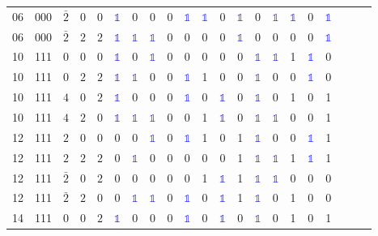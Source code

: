 \begin{longtable*}{c| cccccccccccccccccccc }
06& 000& $\bar{2}$& $0$& $0$& \textcolor{blue}{$\mathds{1}$}& 0& 0& 0& \textcolor{blue}{$\mathds{1}$}& \textcolor{blue}{$\mathds{1}$}& 0& \textcolor{blue}{$\mathds{1}$}& 0& \textcolor{blue}{$\mathds{1}$}& \textcolor{blue}{$\mathds{1}$}& 0& \textcolor{blue}{$\mathds{1}$}\\
06& 000& $\bar{2}$& $2$& $2$& \textcolor{blue}{$\mathds{1}$}& \textcolor{blue}{$\mathds{1}$}& \textcolor{blue}{$\mathds{1}$}& 0& 0& 0& 0& \textcolor{blue}{$\mathds{1}$}& 0& 0& 0& 0& \textcolor{blue}{$\mathds{1}$}\\
10& 111& $0$& $0$& $0$& \textcolor{blue}{$\mathds{1}$}& 0& \textcolor{blue}{$\mathds{1}$}& 0& 0& 0& 0& 0& \textcolor{blue}{$\mathds{1}$}& \textcolor{blue}{$\mathds{1}$}& 1& \textcolor{blue}{$\mathds{1}$}& 0\\
10& 111& $0$& $2$& $2$& \textcolor{blue}{$\mathds{1}$}& \textcolor{blue}{$\mathds{1}$}& 0& 0& \textcolor{blue}{$\mathds{1}$}& 1& 0& 0& \textcolor{blue}{$\mathds{1}$}& 0& 0& \textcolor{blue}{$\mathds{1}$}& 0\\
10& 111& $4$& $0$& $2$& \textcolor{blue}{$\mathds{1}$}& 0& 0& 0& \textcolor{blue}{$\mathds{1}$}& 0& \textcolor{blue}{$\mathds{1}$}& 0& \textcolor{blue}{$\mathds{1}$}& 0& 1& 0& 1\\
10& 111& $4$& $2$& $0$& \textcolor{blue}{$\mathds{1}$}& \textcolor{blue}{$\mathds{1}$}& \textcolor{blue}{$\mathds{1}$}& 0& 0& 1& \textcolor{blue}{$\mathds{1}$}& 0& \textcolor{blue}{$\mathds{1}$}& \textcolor{blue}{$\mathds{1}$}& 0& 0& 1\\
12& 111& $2$& $0$& $0$& 0& 0& \textcolor{blue}{$\mathds{1}$}& 0& \textcolor{blue}{$\mathds{1}$}& 1& 0& 1& \textcolor{blue}{$\mathds{1}$}& 0& 0& \textcolor{blue}{$\mathds{1}$}& 1\\
12& 111& $2$& $2$& $2$& 0& \textcolor{blue}{$\mathds{1}$}& 0& 0& 0& 0& 0& 1& \textcolor{blue}{$\mathds{1}$}& \textcolor{blue}{$\mathds{1}$}& 1& \textcolor{blue}{$\mathds{1}$}& 1\\
12& 111& $\bar{2}$& $0$& $2$& 0& 0& 0& 0& 0& 1& \textcolor{blue}{$\mathds{1}$}& 1& \textcolor{blue}{$\mathds{1}$}& \textcolor{blue}{$\mathds{1}$}& 0& 0& 0\\
12& 111& $\bar{2}$& $2$& $0$& 0& \textcolor{blue}{$\mathds{1}$}& \textcolor{blue}{$\mathds{1}$}& 0& \textcolor{blue}{$\mathds{1}$}& 0& \textcolor{blue}{$\mathds{1}$}& 1& \textcolor{blue}{$\mathds{1}$}& 0& 1& 0& 0\\
14& 111& $0$& $0$& $2$& \textcolor{blue}{$\mathds{1}$}& 0& 0& 0& \textcolor{blue}{$\mathds{1}$}& 0& \textcolor{blue}{$\mathds{1}$}& 0& \textcolor{blue}{$\mathds{1}$}& 0& 1& 0& 1\\

\end{longtable*}
